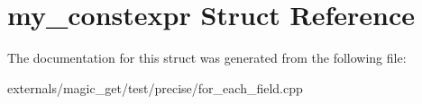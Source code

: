 \hypertarget{structmy__constexpr}{}\section{my\+\_\+constexpr Struct Reference}
\label{structmy__constexpr}


The documentation for this struct was generated from the following file\+:\begin{DoxyCompactItemize}
\item 
externals/magic\+\_\+get/test/precise/for\+\_\+each\+\_\+field.\+cpp\end{DoxyCompactItemize}

